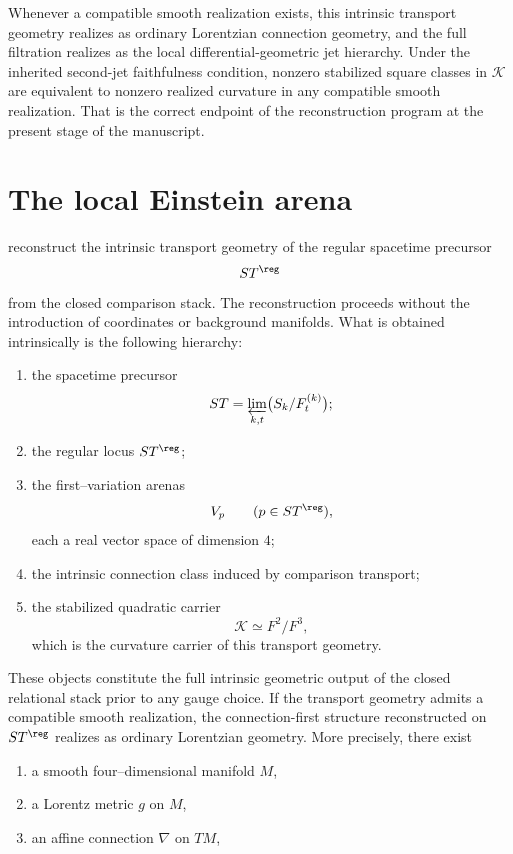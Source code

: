Whenever a compatible smooth realization exists, this intrinsic
transport geometry realizes as ordinary Lorentzian connection geometry,
and the full filtration realizes as the local differential-geometric
jet hierarchy.  Under the inherited second-jet faithfulness condition,
nonzero stabilized square classes in \(\mathcal K\) are equivalent to
nonzero realized curvature in any compatible smooth realization.
That is the correct endpoint of the reconstruction program at the
present stage of the manuscript.
\section{The local Einstein arena}
\label{sec:einstein-local-arena}
reconstruct the intrinsic transport geometry of
the regular spacetime precursor
\[
	ST^{\reg}
\]
from the closed comparison stack.  The reconstruction proceeds without
the introduction of coordinates or background manifolds.  What is
obtained intrinsically is the following hierarchy:
\begin{enumerate}[label=\textup{(\roman*)}]
	\item
	      the spacetime precursor
	      \[
		      ST=\varprojlim_{k,t}\bigl(S_k/F_t^{(k)}\bigr);
	      \]
	\item
	      the regular locus \(ST^{\reg}\);
	\item
	      the first--variation arenas
	      \[
		      V_p \qquad (p\in ST^{\reg}),
	      \]
	      each a real vector space of dimension \(4\);
	\item
	      the intrinsic connection class induced by comparison transport;
	\item
	      the stabilized quadratic carrier
	      \[
		      \mathcal K \simeq F^2/F^3,
	      \]
	      which is the curvature carrier of this transport geometry.
\end{enumerate}
These objects constitute the full intrinsic geometric output of the
closed relational stack prior to any gauge choice.
\medskip
If the transport geometry admits a compatible smooth realization, the
connection-first structure reconstructed on \(ST^{\reg}\) realizes as
ordinary Lorentzian geometry.  More precisely, there exist
\begin{enumerate}[label=\textup{(\roman*)}]
	\item
	      a smooth four--dimensional manifold \(M\),
	\item
	      a Lorentz metric \(g\) on \(M\),
	\item
	      an affine connection \(\nabla\) on \(TM\),
\end{enumerate}
